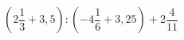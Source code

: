 \begin{ex}[type=calculate]
	\begin{condition}
		\( \left( 2\dfrac{1}{3}+3,5 \right):\left( -4\dfrac{1}{6}+3,25 \right)+2\dfrac{4}{11} \)
	\end{condition}
	\answer{}
\end{ex}